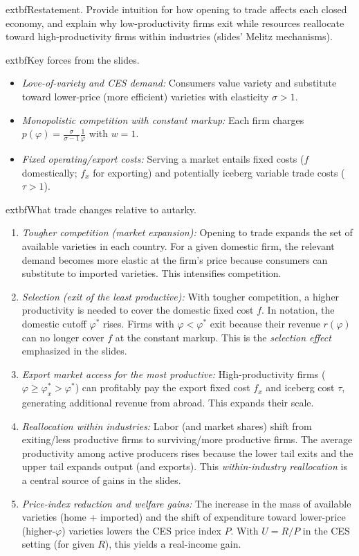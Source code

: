 \begin{solution}
	extbf{Restatement.} Provide intuition for how opening to trade affects each closed economy, and explain why low-productivity firms exit while resources reallocate toward high-productivity firms within industries (slides’ Melitz mechanisms).

\bigskip
	extbf{Key forces from the slides.}
\begin{itemize}
	\item \emph{Love-of-variety and CES demand:} Consumers value variety and substitute toward lower-price (more efficient) varieties with elasticity $\sigma>1$.
	\item \emph{Monopolistic competition with constant markup:} Each firm charges $p(\varphi)=\tfrac{\sigma}{\sigma-1}\tfrac{1}{\varphi}$ with $w=1$.
	\item \emph{Fixed operating/export costs:} Serving a market entails fixed costs ($f$ domestically; $f_x$ for exporting) and potentially iceberg variable trade costs ($\tau>1$).
\end{itemize}

\bigskip
	extbf{What trade changes relative to autarky.}
\begin{enumerate}
	\item \emph{Tougher competition (market expansion):} Opening to trade expands the set of available varieties in each country. For a given domestic firm, the relevant demand becomes more elastic at the firm’s price because consumers can substitute to imported varieties. This intensifies competition.
	\item \emph{Selection (exit of the least productive):} With tougher competition, a higher productivity is needed to cover the domestic fixed cost $f$. In notation, the domestic cutoff $\varphi^*$ rises. Firms with $\varphi<\varphi^*$ exit because their revenue $r(\varphi)$ can no longer cover $f$ at the constant markup. This is the \emph{selection effect} emphasized in the slides.
	\item \emph{Export market access for the most productive:} High-productivity firms ($\varphi\ge \varphi_x^*>\varphi^*$) can profitably pay the export fixed cost $f_x$ and iceberg cost $\tau$, generating additional revenue from abroad. This expands their scale.
	\item \emph{Reallocation within industries:} Labor (and market shares) shift from exiting/less productive firms to surviving/more productive firms. The average productivity among active producers rises because the lower tail exits and the upper tail expands output (and exports). This \emph{within-industry reallocation} is a central source of gains in the slides.
	\item \emph{Price-index reduction and welfare gains:} The increase in the mass of available varieties (home + imported) and the shift of expenditure toward lower-price (higher-$\varphi$) varieties lowers the CES price index $P$. With $U=R/P$ in the CES setting (for given $R$), this yields a real-income gain.
\end{enumerate}


\end{solution}
